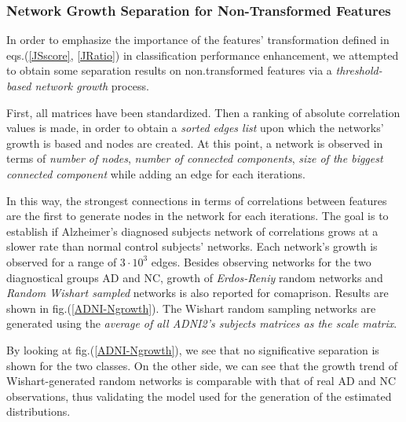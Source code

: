 \documentclass[12pt,openright,twoside,a4paper]{book}
\begin{document}
\subsubsection*{Network Growth Separation for Non-Transformed Features}

In order to emphasize the importance of the features' transformation defined in eqs.(\ref{JSscore}, \ref{JRatio}) in classification performance enhancement, we attempted to obtain some separation results on non.transformed features via a \textit{threshold-based network growth} process.

First, all matrices have been standardized. Then a ranking of absolute correlation values is made, in order to obtain a \textit{sorted edges list} upon which the networks' growth is based and nodes are created.
At this point, a network is observed in terms of \textit{number of nodes}, \textit{number of connected components}, \textit{size of the biggest connected component} while adding an edge for each iterations. 

In this way, the strongest connections in terms of correlations between features are the first to generate nodes in the network for each iterations. The goal is to establish if Alzheimer's diagnosed subjects network of correlations grows at a slower rate than normal control subjects' networks.
Each network's growth is observed for a range of $3\cdot 10^3$ edges.
Besides observing networks for the two diagnostical groups AD and NC,  growth of \textit{Erdos-Reniy} random networks and \textit{Random Wishart sampled} networks is also reported for comaprison. Results are shown in fig.(\ref{ADNI-Ngrowth}).
The Wishart random sampling networks are generated using the \textit{average of all ADNI2's subjects matrices as the scale matrix}.

By looking at fig.(\ref{ADNI-Ngrowth}), we see that no significative separation is shown for the two classes.
On the other side, we can see that the growth trend of Wishart-generated random networks is comparable with that of real AD and NC observations, thus validating the model used for the generation of the estimated distributions.
\end{document}
